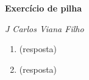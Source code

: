 \documentclass[a4paper,11pt]{article}
\begin{document}
\begin{flushright}
\makeatletter
\textit{\@date}
\makeatother
\end{flushright}

\begin{center}
{\Large \textbf{Exercício de pilha}}
\end{center}

\textit{J Carlos Viana Filho}


\begin{enumerate}

\item (resposta)


\item (resposta)


\end{enumerate}
\end{document}
